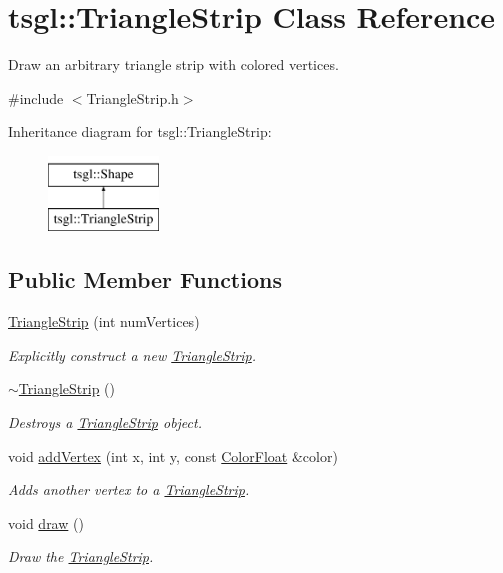\hypertarget{classtsgl_1_1_triangle_strip}{\section{tsgl\-:\-:\-Triangle\-Strip \-Class \-Reference}
\label{classtsgl_1_1_triangle_strip}
}


\-Draw an arbitrary triangle strip with colored vertices.  




{\ttfamily \#include $<$\-Triangle\-Strip.\-h$>$}

\-Inheritance diagram for tsgl\-:\-:\-Triangle\-Strip\-:\begin{figure}[H]
\begin{center}
\leavevmode
\includegraphics[height=2.000000cm]{classtsgl_1_1_triangle_strip}
\end{center}
\end{figure}
\subsection*{\-Public \-Member \-Functions}
\begin{DoxyCompactItemize}
\item 
\hyperlink{classtsgl_1_1_triangle_strip_ad68084f6e384f9faf86f2de673de0502}{\-Triangle\-Strip} (int num\-Vertices)
\begin{DoxyCompactList}\small\item\em \-Explicitly construct a new \hyperlink{classtsgl_1_1_triangle_strip}{\-Triangle\-Strip}. \end{DoxyCompactList}\item 
\hyperlink{classtsgl_1_1_triangle_strip_aab2dc311f7c7df4712c901878c048d96}{$\sim$\-Triangle\-Strip} ()
\begin{DoxyCompactList}\small\item\em \-Destroys a \hyperlink{classtsgl_1_1_triangle_strip}{\-Triangle\-Strip} object. \end{DoxyCompactList}\item 
void \hyperlink{classtsgl_1_1_triangle_strip_ad1773092235f2477bae32f10387874ef}{add\-Vertex} (int x, int y, const \hyperlink{structtsgl_1_1_color_float}{\-Color\-Float} \&color)
\begin{DoxyCompactList}\small\item\em \-Adds another vertex to a \hyperlink{classtsgl_1_1_triangle_strip}{\-Triangle\-Strip}. \end{DoxyCompactList}\item 
void \hyperlink{classtsgl_1_1_triangle_strip_a7a984063f85c8b6ab61bd6e989d38920}{draw} ()
\begin{DoxyCompactList}\small\item\em \-Draw the \hyperlink{classtsgl_1_1_triangle_strip}{\-Triangle\-Strip}. \end{DoxyCompactList}\end{DoxyCompactItemize}


